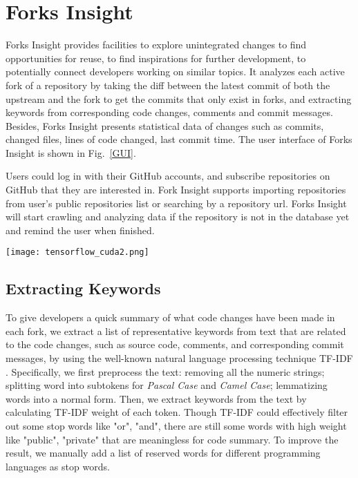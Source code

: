 \section{Forks Insight}

Forks Insight provides facilities to explore unintegrated changes to find opportunities for reuse, to find inspirations for further development, to potentially connect developers working on similar topics.
%
It analyzes each active fork of a repository by taking the diff between the latest commit of both the upstream and the fork to get the commits that only exist in forks, and extracting keywords from corresponding code changes, comments and commit messages.
%
Besides, Forks Insight presents statistical data of changes such as commits, changed files, lines of code changed, last commit time. The user interface of Forks Insight is shown in Fig.~\ref{GUI}.

Users could log in with their GitHub accounts, and subscribe repositories on GitHub that they are interested in. Fork Insight supports importing repositories from user's public repositories list or searching by a repository url. Forks Insight will start crawling and analyzing data if the repository is not in the database yet and remind the user when finished.

\begin{figure*}[ht]
\begin{centering}
\texttt{[image: tensorflow\_cuda2.png]}
\caption{User Interface of Forks Insight. This example shows searching "cuda" in repository of \emph{tensorflow/tensorflow}.}
\vspace{-3pt}
\label{GUI}
\end{centering}
\end{figure*}

\subsection{Extracting Keywords}
To give developers a quick summary of what code changes have been made in each fork, we extract a list of representative keywords from text that are related to the code changes, such as source code, comments, and corresponding commit messages, by using the well-known natural language processing technique TF-IDF \cite{salton1988term}. Specifically, we first preprocess the text: removing all the numeric strings; splitting word into subtokens for \emph{Pascal Case} and \emph{Camel Case}; lemmatizing words into a normal form. Then, we extract keywords from the text by calculating TF-IDF weight of each token. Though TF-IDF could effectively filter out some stop words like "or", "and", there are still some words with high weight like "public", "private" that are meaningless for code summary. To improve the result, we manually add a list of  reserved words for different programming languages as stop words.


